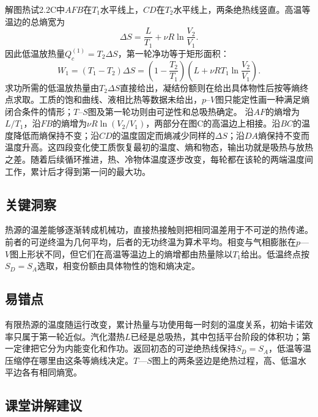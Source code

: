 \documentclass[UTF8,fontset=fandol,a4paper,11pt]{ctexart}
\begin{document}
解图热试2.2C中$AFB$在$T_1$水平线上，$CD$在$T_2$水平线上，两条绝热线竖直。高温等温边的总熵宽为
\[
\Delta S=\frac{L}{T_1}+\nu R\ln\frac{V_2}{V_1}.
\]
因此低温放热量$Q_c^{(1)}=T_2\Delta S$，第一轮净功等于矩形面积：
\[
\boxed{W_1=(T_1-T_2)\Delta S
=\left(1-\frac{T_2}{T_1}\right)
\left(L+\nu RT_1\ln\frac{V_2}{V_1}\right)}.
\]
求功所需的低温放热量由$T_2\Delta S$直接给出，凝结份额则在给出具体物性后按等熵终点求取。工质的饱和曲线、液相比热等数据未给出，$p$--$V$图只能定性画一种满足熵闭合条件的情形；$T$--$S$图及第一轮功则由可逆性和总吸热确定。
沿$AF$的熵增为$L/T_1$，沿$FB$的熵增为$\nu R\ln(V_2/V_1)$，两部分在图C的高温边上相接。沿$BC$的温度降低而熵保持不变；沿$CD$的温度固定而熵减少同样的$\Delta S$；沿$DA$熵保持不变而温度升高。这四段变化使工质恢复最初的温度、熵和物态，输出功就是吸热与放热之差。随着后续循环推进，热、冷物体温度逐步改变，每轮都在该轮的两端温度间工作，累计后才得到第一问的最大功。





\subsection*{关键洞察}

热源的温差能够逐渐转成机械功，直接热接触则把相同温差用于不可逆的热传递。前者的可逆终温为几何平均，后者的无功终温为算术平均。相变与气相膨胀在$p$—$V$图上形状不同，但它们在高温等温边上的熵增都由热量除以$T_1$给出。低温终点按$S_D=S_A$选取，相变份额由具体物性的饱和熵决定。



\subsection*{易错点}

有限热源的温度随运行改变，累计热量与功使用每一时刻的温度关系，初始卡诺效率只属于第一轮近似。汽化潜热$L$已经是总吸热，其中包括平台阶段的体积功；第一定律把它分为内能变化和作功。返回初态的可逆绝热线保持$S_D=S_A$，低温等温压缩停在哪里由这条等熵线决定。$T$—$S$图上的两条竖边是绝热过程，高、低温水平边各有相同熵宽。



\subsection*{课堂讲解建议}
\end{document}
